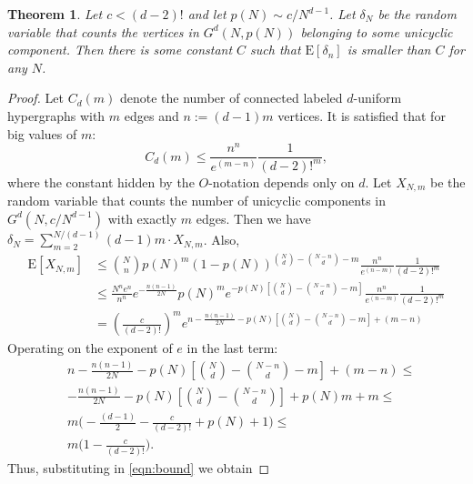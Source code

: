 \documentclass[11pt,notitlepage,a4paper]{article}
\newtheorem{theorem}{Theorem}[section]
\theoremstyle{definition}
\begin{document}
\begin{theorem}
	Let $c<(d-2)!$ and let $p(N)\sim c/N^{d-1}$. Let $\delta_N$ be the
	random variable that counts the vertices in $G^d(N,p(N))$ belonging
	to some unicyclic component. Then there is some constant $C$ such that 
	$\mathrm{E}[\delta_n]$ is smaller than $C$ for any $N$. 
\end{theorem}
\begin{proof}
	Let $C_d(m)$ denote the number of connected labeled $d$-uniform
	hypergraphs with $m$ edges and $n:=(d-1)m$ vertices. It is satisfied 
	that for big values of $m$:
	\[C_d(m)\leq \frac{n^n}{e^{(m-n)}}\frac{1}{(d-2)!^m},\]
	where the constant hidden by the $O$-notation depends only on $d$.
	Let $X_{N,m}$ be the random variable that counts the number of
	unicyclic components in $G^d(N,c/N^{d-1})$ with exactly $m$ edges.
	Then we have $\delta_N =\sum_{m=2}^{N/(d-1)} (d-1)m \cdot X_{N,m}$.
	Also,
	\begin{align}
	\nonumber \mathrm{E}[X_{N,m}] & \leq 
	\binom{N}{n} p(N)^m
	(1-p(N))^{\binom{N}{d}-\binom{N-n}{d} - m}  \frac{n^n}{e^{(n-m)}}\frac{1}{(d-2)!^m}\\ 
	&\nonumber \leq \frac{N^ne^n}{n^n}e^{-\frac{n(n-1)}{2N}}p(N)^m
	e^{-p(N)\left[\binom{N}{d}-\binom{N-n}{d} - m\right]}
	\frac{n^n}{e^{(n-m)}}\frac{1}{(d-2)!^m}\\
	&\label{eqn:bound} =\left(\frac{c}{(d-2)!}\right)^m e^{n-\frac{n(n-1)}{2N}
	-p(N)\left[\binom{N}{d}-\binom{N-n}{d} - m\right]+ 
	(m-n)} 
	\end{align}
	Operating on the exponent of $e$ in the last term:
	\begin{align*}
	&n-\frac{n(n-1)}{2N}
	-p(N)\left[\binom{N}{d}-\binom{N-n}{d} - m\right]+ 
	(m-n)\leq\\ 
	&- \frac{n(n-1)}{2N} - p(N)\left[\binom{N}{d}-\binom{N-n}{d}\right]
	+ p(N)m + m \leq \\
	& m\Big(-\frac{(d-1)}{2} - \frac{c}{(d-2)!} + p(N) + 1\Big)	\leq \\
	& m\Big(1 - \frac{c}{(d-2)!} \Big).	
	\end{align*}
	Thus, substituting in \cref{eqn:bound} we obtain

\end{proof}
\end{document}
